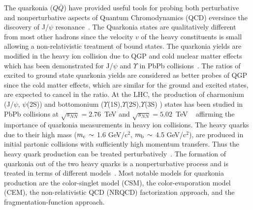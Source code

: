 \documentclass[12pt,a4paper,final]{iopart}
\begin{document}
 The quarkonia ($Q\bar Q$) have provided useful tools for probing both 
perturbative and nonperturbative aspects of Quantum Chromodynamics (QCD) 
eversince the discovery of J/$\psi$ resonance~\cite{Augustin:1974xw,Aubert:1974js}. 
 The Quarkonia states are qualitatively different from most other hadrons since 
the velocity $v$ of the heavy constituents is small allowing a 
non-relativistic treatment of bound states. 
{\color{black}
 The quarkonia yields are modified in the heavy ion collision due to QGP
  and cold nuclear matter effects which has been demonstrated for J/$\psi$ and $\Upsilon$ 
  in PbPb collisions~\cite{Braun-Munzinger:2015hba,Kumar:2014kfa,Mocsy:2013syh}. The ratios of excited to ground state quarkonia 
  yields are considered as better probes of QGP since the cold matter effects, 
  which are similar for the ground and excited states, are expected to cancel in the 
  ratio. At the LHC, the production of charmonium (J/$\psi$, $\psi$(2S)) 
  and bottomonium ($\Upsilon$(1S),$\Upsilon$(2S),$\Upsilon$(3S) ) states has been studied in 
  PbPb collisions at $\sqrt{s_{NN}} = 2.76$~TeV and $\sqrt{s_{NN}} = 5.02$~TeV
  ~\cite{Chatrchyan:2012lxa,Khachatryan:2014bva,Khachatryan:2016ypw,Sirunyan:2016znt,Khachatryan:2016xxp,Abelev:2013ila}
  affirming the importance of quarkonia measurements in heavy ion collisions.
}
  The heavy quarks due to their high mass 
($m_{\rm c}\,\sim$ 1.6 GeV/c$^2$, $m_{\rm b}\,\sim$ 4.5 GeV/c$^2$), 
are produced in initial partonic collisions with sufficiently high momentum 
transfers. Thus the heavy quark production can be treated 
perturbatively~\cite{Nason:1987xz,Nason:1989zy}.
  The formation of quarkonia out of the two heavy quarks is a nonperturbative 
process and is treated in terms of different 
models~\cite{Bodwin:1994jh,Brambilla:2010cs,Brambilla:2014jmp}. 
  Most notable models for quarkonia production are the color-singlet
model (CSM), the color-evaporation model (CEM), the non-relativistic QCD
(NRQCD) factorization approach, and the fragmentation-function approach.
\end{document}
